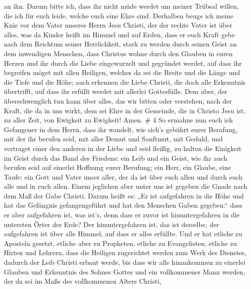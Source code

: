an ihn.  Darum bitte ich, dass ihr nicht müde werdet um
meiner Trübsal willen, die ich für euch leide, welche euch eine Ehre
sind.  Derhalben beuge ich meine Knie vor dem Vater unseres
Herrn Jesu Christi,  der der rechte Vater ist über alles,
was da Kinder heißt im Himmel und auf Erden,  dass er euch
Kraft gebe nach dem Reichtum seiner Herrlichkeit, stark zu werden durch
seinen Geist an dem inwendigen Menschen,  dass Christus
wohne durch den Glauben in euren Herzen und ihr durch die Liebe
eingewurzelt und gegründet werdet,  auf dass ihr begreifen
möget mit allen Heiligen, welches da sei die Breite und die Länge und
die Tiefe und die Höhe;  auch erkennen die Liebe Christi,
die doch alle Erkenntnis übertrifft, auf dass ihr erfüllt werdet mit
allerlei Gottesfülle.  Dem aber, der überschwenglich tun
kann über alles, das wir bitten oder verstehen, nach der Kraft, die da
in uns wirkt,  dem sei Ehre in der Gemeinde, die in Christo
Jesu ist, zu aller Zeit, von Ewigkeit zu Ewigkeit! Amen. \# 4
 So ermahne nun euch ich Gefangener in dem Herrn, dass ihr
wandelt, wie sich's gebührt eurer Berufung, mit der ihr berufen seid,
 mit aller Demut und Sanftmut, mit Geduld, und vertraget
einer den anderen in der Liebe  und seid fleißig, zu halten
die Einigkeit im Geist durch das Band des Friedens:  ein
Leib und ein Geist, wie ihr auch berufen seid auf einerlei Hoffnung
eurer Berufung;  ein Herr, ein Glaube, eine Taufe;
 ein Gott und Vater unser aller, der da ist über euch allen
und durch euch alle und in euch allen.  Einem jeglichen aber
unter uns ist gegeben die Gnade nach dem Maß der Gabe Christi.
 Darum heißt es: „Er ist aufgefahren in die Höhe und hat das
Gefängnis gefangengeführt und hat den Menschen Gaben gegeben.``
 dass er aber aufgefahren ist, was ist's, denn dass er zuvor
ist hinuntergefahren in die untersten Örter der Erde?  Der
hinuntergefahren ist, das ist derselbe, der aufgefahren ist über alle
Himmel, auf dass er alles erfüllte.  Und er hat etliche zu
Aposteln gesetzt, etliche aber zu Propheten, etliche zu Evangelisten,
etliche zu Hirten und Lehrern,  dass die Heiligen
zugerichtet werden zum Werk des Dienstes, dadurch der Leib Christi
erbaut werde,  bis dass wir alle hinankommen zu einerlei
Glauben und Erkenntnis des Sohnes Gottes und ein vollkommener Mann
werden, der da sei im Maße des vollkommenen Alters Christi,
